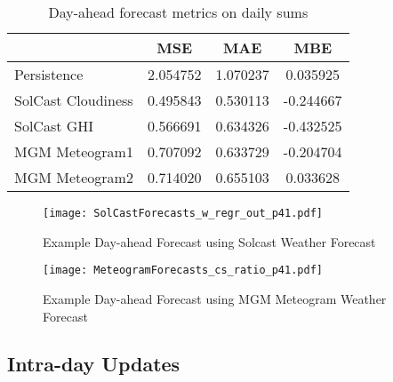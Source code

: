 \begin{table}[tbh]
	\caption{Day-ahead forecast metrics on daily sums}
	\label{table:variables}
	\begin{tabular}{lccc}
		\toprule
		                       &   MSE    &   MAE    &    MBE    \\
        \midrule
		Persistence            & 2.054752 & 1.070237 & 0.035925  \\
		SolCast Cloudiness     & 0.495843 & 0.530113 & -0.244667 \\
		SolCast GHI            & 0.566691 & 0.634326 & -0.432525 \\
		MGM Meteogram1         & 0.707092 & 0.633729 & -0.204704 \\
		MGM Meteogram2         & 0.714020 & 0.655103 & 0.033628  \\
		\bottomrule
	\end{tabular}
\end{table}


\begin{figure}[tbh]
	\centering
	\texttt{[image: SolCastForecasts\_w\_regr\_out\_p41.pdf]}
	\caption{Example Day-ahead Forecast using Solcast Weather Forecast}
	\label{fig:dayahead-forecast-solcast}
\end{figure}


\begin{figure}[tbh]
	\centering
	\texttt{[image: MeteogramForecasts\_cs\_ratio\_p41.pdf]}
	\caption{Example Day-ahead Forecast using MGM Meteogram Weather Forecast}
	\label{fig:dayahead-forecast-meteogram}
\end{figure}


\subsection{Intra-day Updates}

